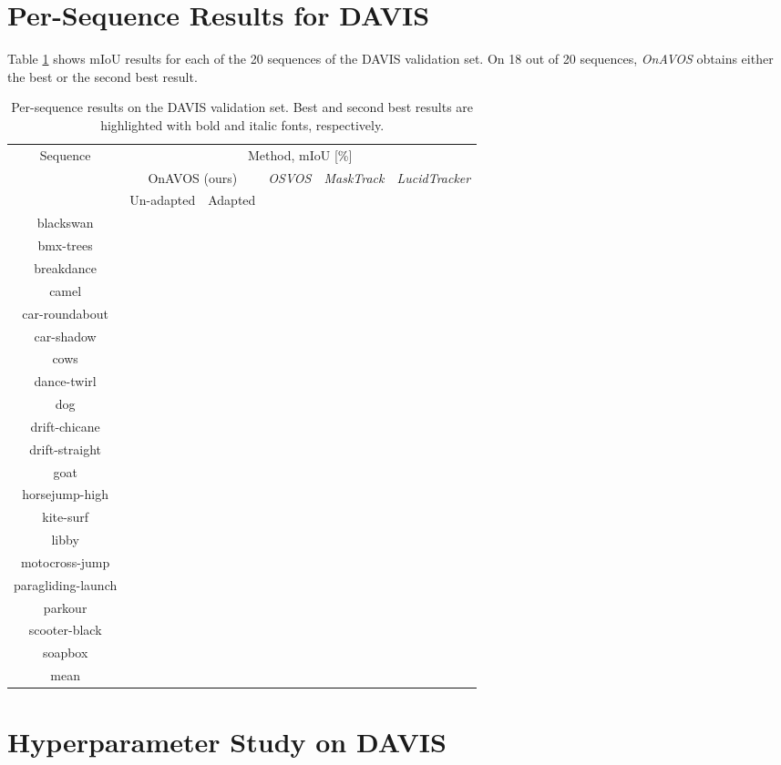 \documentclass{bmvc2k}
\newcommand{\methodname}[1]{\mbox{\emph{#1}}}
\begin{document}
\section{Per-Sequence Results for DAVIS}

Table \ref{tab:perseq} shows mIoU results for each of the 20 sequences of the DAVIS validation set. On 18 out of 20 sequences, \methodname{OnAVOS} obtains either the best or the second best result.

\begin{table}[h!]
\footnotesize
\begin{center}
\begin{tabular}{|c|c|c|c|c|c|}
\hline 
\multirow{3}{*}{Sequence} & \multicolumn{5}{c|}{Method, mIoU {[}\%{]}}\tabularnewline
\cline{2-6} 
 & \multicolumn{2}{c|}{OnAVOS (ours) } & \multirow{2}{*}{\methodname{OSVOS} \cite{OSVOS}} & \multirow{2}{*}{\methodname{MaskTrack} \cite{masktrack}} & \multirow{2}{*}{\methodname{LucidTracker} \cite{lucidtracker}}\tabularnewline
\cline{2-3} 
 & Un-adapted & Adapted &  &  & \tabularnewline
\hline 
\hline 
blackswan &  &  &  &  & \tabularnewline
bmx-trees &  &  &  &  & \tabularnewline
breakdance &  &  &  &  & \tabularnewline
camel &  &  &  &  & \tabularnewline
car-roundabout &  &  &  &  & \tabularnewline
car-shadow &  &  &  &  & \tabularnewline
cows &  &  &  &  & \tabularnewline
dance-twirl &  &  &  &  & \tabularnewline
dog &  &  &  &  & \tabularnewline
drift-chicane &  &  &  &  & \tabularnewline
drift-straight &  &  &  &  & \tabularnewline
goat &  &  &  &  & \tabularnewline
horsejump-high &  &  &  &  & \tabularnewline
kite-surf &  &  &  &  & \tabularnewline
libby &  &  &  &  & \tabularnewline
motocross-jump &  &  &  &  & \tabularnewline
paragliding-launch &  &  &  &  & \tabularnewline
parkour &  &  &  &  & \tabularnewline
scooter-black &  &  &  &  & \tabularnewline
soapbox &  &  &  &  & \tabularnewline
\hline 
mean &  &  &  &  & \tabularnewline
\hline 
\end{tabular}
\end{center}
\caption{\label{tab:perseq}Per-sequence results on the DAVIS validation set. Best and second best results are highlighted with bold and italic fonts, respectively.}

\end{table}







\section{Hyperparameter Study on DAVIS}\label{sec:hyperparams}
\end{document}
